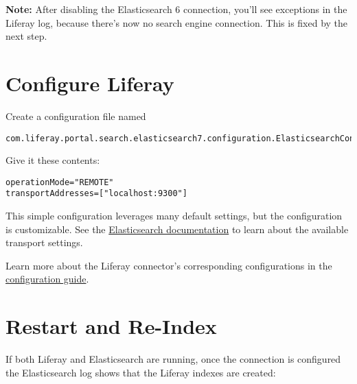\noindent\hrulefill

\textbf{Note:} After disabling the Elasticsearch 6 connection, you'll
see exceptions in the Liferay log, because there's now no search engine
connection. This is fixed by the next step.

\noindent\hrulefill

\section{Configure Liferay}\label{configure-liferay}

Create a configuration file named

\begin{verbatim}
com.liferay.portal.search.elasticsearch7.configuration.ElasticsearchConfiguration.config
\end{verbatim}

Give it these contents:

\begin{verbatim}
operationMode="REMOTE"
transportAddresses=["localhost:9300"]
\end{verbatim}

This simple configuration leverages many default settings, but the
configuration is customizable. See the
\href{https://www.elastic.co/guide/en/elasticsearch/reference/7.12/modules-network.html\#transport-settings}{Elasticsearch
documentation} to learn about the available transport settings.

Learn more about the Liferay connector's corresponding configurations in
the
\href{/docs/7-1/deploy/-/knowledge_base/d/configuring-the-liferay-elasticsearch-connector}{configuration
guide}.

\section{Restart and Re-Index}\label{restart-and-re-index}

If both Liferay and Elasticsearch are running, once the connection is
configured the Elasticsearch log shows that the Liferay indexes are
created:

